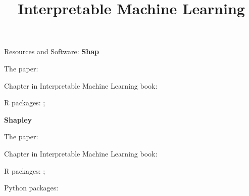 \documentclass[10pt,compress,t,notes=noshow, xcolor=table]{beamer}
\title{Interpretable Machine Learning}
\begin{document}


\begin{framev}[align=top]{Resources and Software:}
\textbf{Shap}
\begin{itemizeM}
\item The paper: 
\item Chapter in Interpretable Machine Learning book: 
\item R packages: ; 
\end{itemizeM}
\spacer[0.25]
\textbf{Shapley}
\begin{itemizeM}
\item The paper: 
\item Chapter in Interpretable Machine Learning book: 
\item R packages: ; 
\item Python packages: 
\end{itemizeM}
\end{framev}


\endlecture
\end{document}
